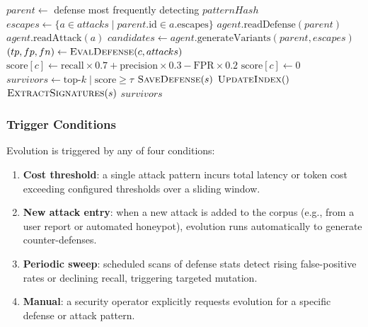 \begin{algorithm}[t]
\caption{Evolution Loop}
\label{alg:EvolutionLoop}
\begin{algorithmic}[1]
  \State $parent \gets$ defense most frequently detecting $patternHash$
  \State $escapes \gets \{a \in attacks \mid parent.\text{id} \in a.\text{escapes}\}$
  \State {}
  \State $agent.\text{readDefense}(parent)$
   $agent.\text{readAttack}(a)$ \EndFor
  \State {}
  \State $candidates \gets agent.\text{generateVariants}(parent, escapes)$
  \State {}
    \State $(tp, fp, fn) \gets \textsc{EvalDefense}(c, attacks)$
    \State $\text{score}[c] \gets \text{recall}\times 0.7 + \text{precision}\times 0.3 - \text{FPR}\times 0.2$
     $\text{score}[c] \gets 0$ \EndIf {}
  \EndFor
  \State $survivors \gets \text{top-}k\; |\; \text{score} \geq \tau$
    \State $\textsc{SaveDefense}(s)$ 
    \State $\textsc{UpdateIndex}()$
    \State $\textsc{ExtractSignatures}(s)$ 
  \EndFor
  \State \Return $survivors$
\EndFunction
\end{algorithmic}
\end{algorithm}

\subsubsection{Trigger Conditions}

Evolution is triggered by any of four conditions:
\begin{enumerate}[nosep]
  \item \textbf{Cost threshold}: a single attack pattern incurs total latency or token cost exceeding configured thresholds over a sliding window.
  \item \textbf{New attack entry}: when a new attack is added to the corpus (e.g., from a user report or automated honeypot), evolution runs automatically to generate counter-defenses.
  \item \textbf{Periodic sweep}: scheduled scans of defense stats detect rising false-positive rates or declining recall, triggering targeted mutation.
  \item \textbf{Manual}: a security operator explicitly requests evolution for a specific defense or attack pattern.
\end{enumerate}

